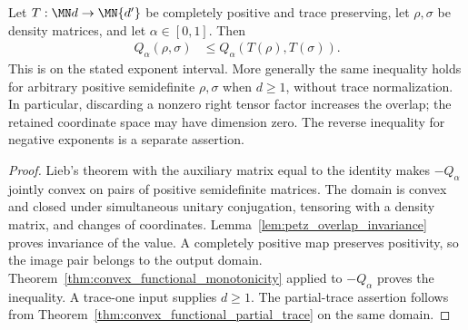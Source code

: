 \begin{theorem}
    \label{thm:petz_overlap_data_processing}
    \leanok
    Let $T:\MN d\to\MN{d'}$ be completely positive and trace preserving,
    let $\rho,\sigma$ be density matrices, and let $\alpha\in[0,1]$. Then
    \begin{align}
        Q_\alpha(\rho,\sigma)
            &\le Q_\alpha(T(\rho),T(\sigma)).
        \label{eq:petz_overlap_data_processing}
    \end{align}
    This is \cite[Equation~(8.35)]{Wolf2012Quantum} on the stated exponent
    interval. More generally the same inequality holds for arbitrary positive
    semidefinite $\rho,\sigma$ when $d\ge1$, without trace normalization.
    In particular, discarding a nonzero right tensor factor increases the
    overlap; the retained coordinate space may have dimension zero.
    The reverse inequality for negative exponents is a separate assertion.
\end{theorem}
\begin{proof}
    \leanok
    Lieb's theorem with the auxiliary matrix equal to the identity makes
    $-Q_\alpha$ jointly convex on pairs of positive semidefinite matrices.
    The domain is convex and closed under simultaneous unitary conjugation,
    tensoring with a density matrix, and changes of coordinates.
    Lemma~\ref{lem:petz_overlap_invariance} proves invariance of the value.
    A completely positive map preserves positivity, so the image pair belongs
    to the output domain. Theorem~\ref{thm:convex_functional_monotonicity}
    applied to $-Q_\alpha$ proves the inequality. A trace-one input supplies
    $d\ge1$. The partial-trace assertion follows from
    Theorem~\ref{thm:convex_functional_partial_trace} on the same domain.
\end{proof}
